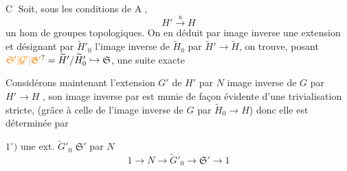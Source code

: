  \textcircled{C} Soit, sous les conditions de \textcircled{A},
\[
 H'\xrightarrow{u}H
\]
un hom de groupes topologiques. On en déduit par image inverse une extension
et désignant par \(\widetilde H'_0\) l'image inverse de \(\widetilde H_0\) par \(\widetilde H'\to\widetilde H\), on trouve, posant \(\unsure{\mathfrak{S}'|\mathcal{G}'|\mathfrak{G}'}=\widetilde H'/\widetilde H'_0\lhook\joinrel\to\mathfrak{S}\), une suite exacte

Considérons maintenant  l'extension \(G'\) de \(H'\) par \(N\) image inverse de \(G\) par \(H'\to H\)
, son image inverse par
est munie de façon évidente d'une trivialisation stricte,  (grâce à celle de l'image inverse de \(G\) par \(\widetilde H_0\to H\)) donc elle est déterminée par

\(1^\circ)\) une ext. \(\widetilde G'_0\)  \(\mathfrak{S}'\) par \(N\)
\[
 1\longrightarrow N\longrightarrow \widetilde G'_0\longrightarrow\mathfrak{S}'\longrightarrow1
\]

